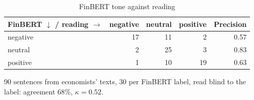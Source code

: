 \begin{table}[htbp]
\centering\small
\caption{FinBERT tone against reading}\label{tab:tone}
\begin{tabular}{@{}lrrrr@{}}
\toprule
\textbf{FinBERT $\downarrow$ / reading $\rightarrow$} & \textbf{negative} & \textbf{neutral} & \textbf{positive} & \textbf{Precision} \\
\midrule
negative & 17 & 11 & 2 & 0.57 \\
neutral & 2 & 25 & 3 & 0.83 \\
positive & 1 & 10 & 19 & 0.63 \\
\bottomrule
\end{tabular}
\par\smallskip\parbox{0.92\linewidth}{\footnotesize 90 sentences from economists' texts, 30 per FinBERT label, read blind to the label: agreement 68\%, $\kappa = 0.52$.}
\end{table}
